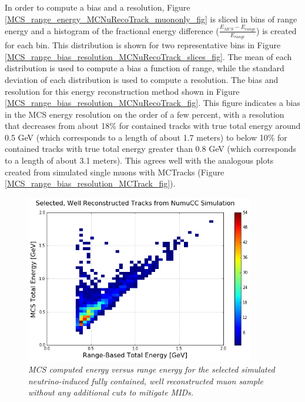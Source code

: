 In order to compute a bias and a resolution, Figure \ref{MCS_range_energy_MCNuRecoTrack_muononly_fig} is sliced in bins of range energy and a histogram of the fractional energy difference ($\frac{E_{MCS} - E_{range}}{E_{range}}$) is created for each bin. This distribution is shown for two representative bins in Figure \ref{MCS_range_bias_resolution_MCNuRecoTrack_slices_fig}. The mean of each distribution is used to compute a bias a function of range, while the standard deviation of each distribution is used to compute a resolution. The bias and resolution for this energy reconstruction method shown in Figure \ref{MCS_range_bias_resolution_MCNuRecoTrack_fig}. This figure indicates a bias in the MCS energy resolution on the order of a few percent, with a resolution that decreases from about 18\% for contained tracks with true total energy around 0.5 GeV (which corresponds to a length of about 1.7 meters) to below 10\% for contained tracks with true total energy greater than 0.8 GeV (which corresponds to a length of about 3.1 meters). This agrees well with the analogous plots created from simulated single muons with {\sc MCTracks} (Figure \ref{MCS_range_bias_resolution_MCTrack_fig}).


\begin{figure}[h!]
\begin{center}
\includegraphics[width=100mm]{Figures/MCS_range_comparison_MCNuRecoTracks_noPDGcut.png}
\end{center}
\caption{\textit{MCS computed energy versus range energy for the selected simulated neutrino-induced fully contained, well reconstructed muon sample without any additional cuts to mitigate MIDs.}}
\label{MCS_range_energy_MCNuRecoTrack_noPDGcut_fig}
\end{figure}

